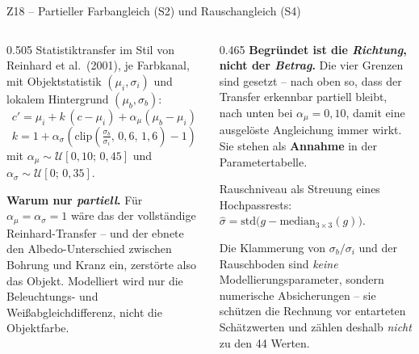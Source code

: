 \documentclass[14pt,aspectratio=169]{beamer}
\begin{document}
\begin{frame}{Z18 -- Partieller Farbangleich (S2) und Rauschangleich (S4)}
\zusatzdicht
\begin{columns}[T,onlytextwidth]
\begin{column}{0.505\textwidth}
Statistiktransfer im Stil von Reinhard et al.\ (2001), je Farbkanal, mit
Objektstatistik $(\mu_i,\sigma_i)$ und lokalem Hintergrund
$(\mu_b,\sigma_b)$:
\[c' = \mu_i + k\,(c-\mu_i) + \alpha_\mu(\mu_b-\mu_i)\]
\[k = 1 + \alpha_\sigma\!\left(\mathrm{clip}\!\left(
   \tfrac{\sigma_b}{\sigma_i},\,0{,}6,\,1{,}6\right)-1\right)\]
mit $\alpha_\mu \sim \mathcal{U}[0{,}10;\,0{,}45]$ und
$\alpha_\sigma \sim \mathcal{U}[0;\,0{,}35]$.
\smallskip

{\color{akzent}\textbf{Warum nur \emph{partiell}.}} Für
$\alpha_\mu = \alpha_\sigma = 1$ wäre das der vollständige
Reinhard-Transfer -- und der ebnete den Albedo-Unterschied zwischen Bohrung
und Kranz ein, zerstörte also das Objekt. Modelliert wird nur die
Beleuchtungs- und Weißabgleichdifferenz, nicht die Objektfarbe.
\end{column}
\begin{column}{0.465\textwidth}
\textbf{Begründet ist die \emph{Richtung}, nicht der \emph{Betrag}.} Die
vier Grenzen sind gesetzt -- nach oben so, dass der Transfer erkennbar
partiell bleibt, nach unten bei $\alpha_\mu = 0{,}10$, damit eine ausgelöste
Angleichung immer wirkt. Sie stehen als \bA{} \textbf{Annahme} in der
Parametertabelle.
\smallskip

Rauschniveau als Streuung eines Hochpassrests:
$\hat\sigma = \mathrm{std}\big(g - \mathrm{median}_{3\times3}(g)\big)$.
\smallskip

{\color{akzent}Die Klammerung von $\sigma_b/\sigma_i$ und der Rauschboden
sind \emph{keine} Modellierungsparameter, sondern numerische Absicherungen --
sie schützen die Rechnung vor entarteten Schätzwerten und zählen deshalb
\emph{nicht} zu den 44 Werten.}
\end{column}
\end{columns}
\end{frame}
\end{document}
